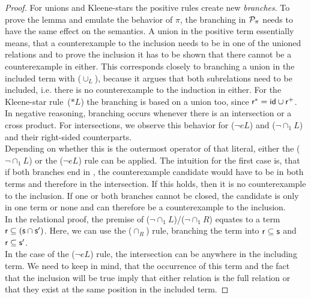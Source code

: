 \documentclass[a4paper,twoside,12pt, english]{article}
\begin{document}
\begin{proof}
For unions and Kleene-stars the positive rules create new \textit{branches}. To prove the lemma and emulate the behavior of $\pi$, the branching in $\mathcal{P}_\pi$ needs to have the same effect on the semantics.
A union in the positive term essentially means, that a counterexample to the inclusion needs to be in one of the unioned relations and to prove the inclusion it has to be shown that there cannot be a counterexample in either.
This corresponds closely to branching a union in the included term with ($\cup_L$), because it argues that both subrelations need to be included, i.e. there is no counterexample to the induction in either.
For the Kleene-star rule~($*L$) the branching is based on a union too, since $\textsf{\upshape r}^* = \textsf{\upshape id} \cup \textsf{\upshape r}^+$. \\
In negative reasoning, branching occurs whenever there is an intersection or a cross product.
For intersections, we observe this behavior for ($\neg eL$) and ($\neg \cap_1 L$) and their right-sided counterparts. \\
Depending on whether this is the outermost operator of that literal, either the ($\neg {\cap_1}L$) or the ($\neg eL$) rule can be applied. The intuition for the first case is, that if both branches end in \false, the counterexample candidate would have to be in both terms and therefore in the intersection. If this holds, then it is no counterexample to the inclusion. \newpage If one or both branches cannot be closed, the candidate is only in one term or none and can therefore be a counterexample to the inclusion. \\ 
In the relational proof, the premise of ($\neg {\cap_1}L$)/($\neg {\cap_1}R$) equates to a term $\textsf{\upshape r} \subseteq (\textsf{\upshape s} \cap \textsf{\upshape s}')$. Here, we can use the ($\cap_R$) rule, branching the term into $\textsf{\upshape r} \subseteq \textsf{\upshape s}$ and $\textsf{\upshape r} \subseteq \textsf{\upshape s}'$. \\
In the case of the ($\neg eL$) rule, the intersection can be anywhere in the including term.
We need to keep in mind, that the occurrence of this term and the fact that the inclusion will be true imply that either relation is the full relation or that they exist at the same position in the included term.

\end{proof}
\end{document}

